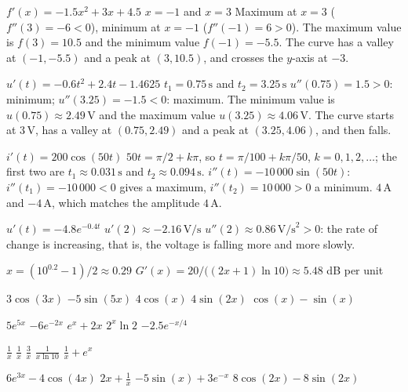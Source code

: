 
\begin{facit}

  $f'(x) = -1.5x^2 + 3x + 4.5$  $x = -1$ and $x = 3$
 Maximum at $x = 3$ ($f''(3) = -6 < 0$), minimum at $x = -1$ ($f''(-1) = 6 > 0$).
 The maximum value is $f(3) = 10.5$ and the minimum value $f(-1) = -5.5$.
 The curve has a valley at $(-1, -5.5)$ and a peak at $(3, 10.5)$, and crosses the $y$-axis
at $-3$.

  $u'(t) = -0.6t^2 + 2.4t - 1.4625$
 $t_1 = 0.75\,\text{s}$ and $t_2 = 3.25\,\text{s}$
 $u''(0.75) = 1.5 > 0$: minimum; $u''(3.25) = -1.5 < 0$: maximum.
 The minimum value is $u(0.75) \approx 2.49\,\text{V}$ and the maximum value
$u(3.25) \approx 4.06\,\text{V}$.
 The curve starts at $3\,\text{V}$, has a valley at $(0.75, 2.49)$ and a peak at
$(3.25, 4.06)$, and then falls.

  $i'(t) = 200\cos(50t)$
 $50t = \pi/2 + k\pi$, so $t = \pi/100 + k\pi/50$,
$k = 0, 1, 2, \ldots$; the first two are $t_1 \approx 0.031\,\text{s}$ and
$t_2 \approx 0.094\,\text{s}$.
 $i''(t) = -10\,000\sin(50t)$: $i''(t_1) = -10\,000 < 0$ gives a maximum,
$i''(t_2) = 10\,000 > 0$ a minimum.
 $4\,\text{A}$ and $-4\,\text{A}$, which matches the amplitude $4\,\text{A}$.

  $u'(t) = -4.8e^{-0.4t}$  $u'(2) \approx -2.16\,\text{V/s}$
 $u''(2) \approx 0.86\,\text{V/s}^2 > 0$: the rate of change is increasing, that is, the
voltage is falling more and more slowly.

  $x = (10^{0.2} - 1)/2 \approx 0.29$
 $G'(x) = 20/\bigl((2x + 1)\ln 10\bigr) \approx 5.48$ dB per unit

  $3\cos(3x)$  $-5\sin(5x)$  $4\cos(x)$  $4\sin(2x)$
 $\cos(x) - \sin(x)$

  $5e^{5x}$  $-6e^{-2x}$  $e^x + 2x$  $2^x \ln 2$
 $-2.5e^{-x/4}$

  $\frac{1}{x}$  $\frac{1}{x}$  $\frac{3}{x}$
 $\frac{1}{x \ln 10}$  $\frac{1}{x} + e^x$

  $6e^{3x} - 4\cos(4x)$  $2x + \frac{1}{x}$  $-5\sin(x) + 3e^{-x}$
 $8\cos(2x) - 8\sin(2x)$


\end{facit}
